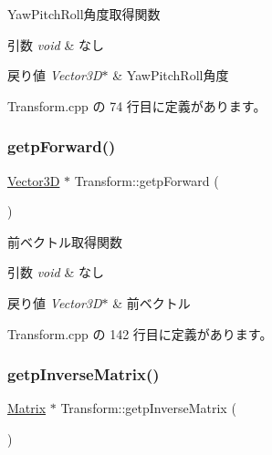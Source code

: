 Yaw\+Pitch\+Roll角度取得関数 


\begin{DoxyParams}{引数}
{\em void} & なし \\
\hline
\end{DoxyParams}

\begin{DoxyRetVals}{戻り値}
{\em Vector3\+D$\ast$} & Yaw\+Pitch\+Roll角度 \\
\hline
\end{DoxyRetVals}


 Transform.\+cpp の 74 行目に定義があります。

\mbox{\label{class_transform_aa01e95eff5d3bb0a2df9d81faa229143}} 
\subsubsection{\texorpdfstring{getp\+Forward()}{getpForward()}}
{\footnotesize\ttfamily \mbox{\hyperlink{class_vector3_d}{Vector3D}} $\ast$ Transform\+::getp\+Forward (\begin{DoxyParamCaption}{ }\end{DoxyParamCaption})}



前ベクトル取得関数 


\begin{DoxyParams}{引数}
{\em void} & なし \\
\hline
\end{DoxyParams}

\begin{DoxyRetVals}{戻り値}
{\em Vector3\+D$\ast$} & 前ベクトル \\
\hline
\end{DoxyRetVals}


 Transform.\+cpp の 142 行目に定義があります。

\mbox{\label{class_transform_af172f4f0dfb057d1ee473d1314787352}} 
\subsubsection{\texorpdfstring{getp\+Inverse\+Matrix()}{getpInverseMatrix()}}
{\footnotesize\ttfamily \mbox{\hyperlink{class_matrix}{Matrix}} $\ast$ Transform\+::getp\+Inverse\+Matrix (\begin{DoxyParamCaption}{ }\end{DoxyParamCaption})}




